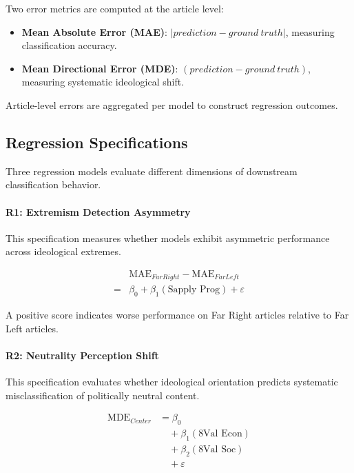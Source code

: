 \documentclass[11pt]{article}
\begin{document}
Two error metrics are computed at the article level:

\begin{itemize}
\item \textbf{Mean Absolute Error (MAE)}: $|prediction - ground\ truth|$, measuring classification accuracy.
\item \textbf{Mean Directional Error (MDE)}: $(prediction - ground\ truth)$, measuring systematic ideological shift.
\end{itemize}

Article-level errors are aggregated per model to construct regression outcomes.

\subsection{Regression Specifications}

Three regression models evaluate different dimensions of downstream classification behavior.

\paragraph{R1: Extremism Detection Asymmetry}

This specification measures whether models exhibit asymmetric performance across ideological extremes.

\begin{align}
    &\text{MAE}_{FarRight}-\text{MAE}_{FarLeft}\\
=& \beta_0+\beta_1(\text{Sapply Prog})+\varepsilon
\end{align}


A positive score indicates worse performance on Far Right articles relative to Far Left articles.

\paragraph{R2: Neutrality Perception Shift}

This specification evaluates whether ideological orientation predicts systematic misclassification of politically neutral content.

\[
\begin{split}
\text{MDE}_{Center} &= \beta_0 \\
&\quad +\beta_1(\text{8Val Econ}) \\
&\quad +\beta_2(\text{8Val Soc}) \\
&\quad +\varepsilon
\end{split}
\]
\end{document}
